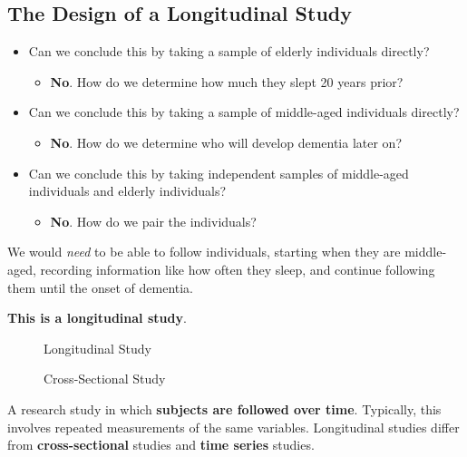 \subsection{The Design of a Longitudinal Study}
\begin{itemize}
    \item Can we conclude this by taking a sample of elderly individuals directly?
          \begin{itemize}
              \item \textbf{No}. How do we determine how much they slept 20 years prior?
          \end{itemize}
    \item Can we conclude this by taking a sample of middle-aged individuals directly?
          \begin{itemize}
              \item \textbf{No}. How do we determine who will develop dementia later on?
          \end{itemize}
    \item Can we conclude this by taking independent samples of middle-aged individuals and
          elderly individuals?
          \begin{itemize}
              \item \textbf{No}. How do we pair the individuals?
          \end{itemize}
\end{itemize}
We would \emph{need} to be able to follow individuals, starting when they are middle-aged,
recording information like how often they sleep, and continue following them until the
onset of dementia.
\begin{framed}
    \centering\textbf{This is a longitudinal study}.
\end{framed}
\begin{figure}[H]
    \centering
    \caption{Longitudinal Study}
\end{figure}
\begin{figure}[H]
    \centering
    \caption{Cross-Sectional Study}
\end{figure}
A research study in which \textbf{subjects are followed over time}.
Typically, this involves
repeated measurements of the same variables.
Longitudinal studies differ from \textbf{cross-sectional} studies and
\textbf{time series} studies.
